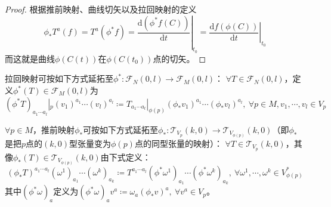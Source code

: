 \begin{proof}
	根据推前映射、曲线切矢以及拉回映射的定义
	$$\phi_*T^a(f)
		= T^a(\phi^*f)
		= \left.\frac{\mathrm{d}(\phi^*f(C))}{\mathrm{d}t}\right|_{t_0}
		= \left.\frac{\mathrm{d}f(\phi(C))}{\mathrm{d}t}\right|_{t_0}$$
	而这就是曲线$\phi(C(t))$在$\phi(C(t_0))$点的切矢。
\end{proof}

\begin{definition}
	拉回映射可按如下方式延拓至$\phi^* \colon \mathscr{F}_N(0, l) \to \mathscr{F}_M(0, l)$：
	$\forall T \in \mathscr{F}_N(0, l)$，定义$\phi^*(T) \in \mathscr{F}_M(0, l)$为
	$$(\phi^*T)_{a_1 \cdots a_l}|_p(v_1)^{a_1}\cdots(v_l)^{a_l} \coloneq T_{a_1 \cdots a_l}|_{\phi(p)}(\phi_*v_1)^{a_1}\cdots(\phi_*v_l)^{a_l}, ~ \forall p \in M, v_1, \cdots, v_l \in V_p$$
\end{definition}

\begin{definition}
	$\forall p \in M$，推前映射$\phi_*$可按如下方式延拓至$\phi_* \colon \mathscr{T}_{V_p}(k, 0) \to \mathscr{T}_{V_{\phi(p)}}(k, 0)$（即$\phi_*$是把$p$点的$(k, 0)$型张量变为$\phi(p)$点的同型张量的映射）：
	$\forall T \in \mathscr{T}_{V_p}(k, 0)$，其像$\phi_*(T) \in \mathscr{T}_{V_{\phi(p)}}(k, 0)$由下式定义：
	$$(\phi_*T)^{a_1 \cdots a_l}(\omega^1)_{a_1}\cdots(\omega^k)_{a_k} \coloneq T^{a_1 \cdots a_l}(\phi^*\omega^1)_{a_1}\cdots(\phi^*\omega^k)_{a_k}, ~ \forall \omega^1, \cdots, \omega^k \in V^*_{\phi(p)}$$
	其中$(\phi^*\omega)_a$定义为$(\phi^*\omega)_av^a \coloneq \omega_a(\phi_*v)^a, ~ \forall v^a \in V_p$。
\end{definition}

